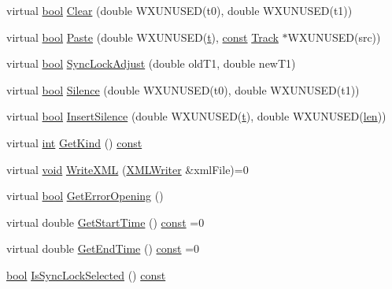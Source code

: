 \begin{DoxyCompactItemize}
virtual \hyperlink{mac_2config_2i386_2lib-src_2libsoxr_2soxr-config_8h_abb452686968e48b67397da5f97445f5b}{bool} \hyperlink{class_track_a725fa0a27976e10fd01859baa2f29ff7}{Clear} (double W\+X\+U\+N\+U\+S\+ED(t0), double W\+X\+U\+N\+U\+S\+ED(t1))
\item 
virtual \hyperlink{mac_2config_2i386_2lib-src_2libsoxr_2soxr-config_8h_abb452686968e48b67397da5f97445f5b}{bool} \hyperlink{class_track_abea1b02917a4dc8ad75331e14f7ea651}{Paste} (double W\+X\+U\+N\+U\+S\+ED(\hyperlink{octave__test_8m_aaccc9105df5383111407fd5b41255e23}{t}), \hyperlink{getopt1_8c_a2c212835823e3c54a8ab6d95c652660e}{const} \hyperlink{class_track}{Track} $\ast$W\+X\+U\+N\+U\+S\+ED(src))
\item 
virtual \hyperlink{mac_2config_2i386_2lib-src_2libsoxr_2soxr-config_8h_abb452686968e48b67397da5f97445f5b}{bool} \hyperlink{class_track_a8d065b881a5fe83b2d938b62f9eba89e}{Sync\+Lock\+Adjust} (double old\+T1, double new\+T1)
\item 
virtual \hyperlink{mac_2config_2i386_2lib-src_2libsoxr_2soxr-config_8h_abb452686968e48b67397da5f97445f5b}{bool} \hyperlink{class_track_aecfb56d63d2cb24884a7a562678d31bd}{Silence} (double W\+X\+U\+N\+U\+S\+ED(t0), double W\+X\+U\+N\+U\+S\+ED(t1))
\item 
virtual \hyperlink{mac_2config_2i386_2lib-src_2libsoxr_2soxr-config_8h_abb452686968e48b67397da5f97445f5b}{bool} \hyperlink{class_track_a60a17fff33826814476f69f93b702235}{Insert\+Silence} (double W\+X\+U\+N\+U\+S\+ED(\hyperlink{octave__test_8m_aaccc9105df5383111407fd5b41255e23}{t}), double W\+X\+U\+N\+U\+S\+ED(\hyperlink{lib_2expat_8h_af86d325fecfc8f47b61fbf5a5146f582}{len}))
\item 
virtual \hyperlink{xmltok_8h_a5a0d4a5641ce434f1d23533f2b2e6653}{int} \hyperlink{class_track_ad71d0460cf42bcde59dcf600af7ef6b7}{Get\+Kind} () \hyperlink{getopt1_8c_a2c212835823e3c54a8ab6d95c652660e}{const} 
\item 
virtual \hyperlink{sound_8c_ae35f5844602719cf66324f4de2a658b3}{void} \hyperlink{class_track_a1352ca92740f520fc35ad17c79072110}{Write\+X\+ML} (\hyperlink{class_x_m_l_writer}{X\+M\+L\+Writer} \&xml\+File)=0
\item 
virtual \hyperlink{mac_2config_2i386_2lib-src_2libsoxr_2soxr-config_8h_abb452686968e48b67397da5f97445f5b}{bool} \hyperlink{class_track_ad4f4b2a5e9fb7ea7cf337010424775f2}{Get\+Error\+Opening} ()
\item 
virtual double \hyperlink{class_track_a764ce3c8ef7dd892b8cf64022a946cd5}{Get\+Start\+Time} () \hyperlink{getopt1_8c_a2c212835823e3c54a8ab6d95c652660e}{const}  =0
\item 
virtual double \hyperlink{class_track_a94b9fd13ee5b04493ed1024715e9c62b}{Get\+End\+Time} () \hyperlink{getopt1_8c_a2c212835823e3c54a8ab6d95c652660e}{const}  =0
\item 
\hyperlink{mac_2config_2i386_2lib-src_2libsoxr_2soxr-config_8h_abb452686968e48b67397da5f97445f5b}{bool} \hyperlink{class_track_a4b9d8ec8baa8ce94f9b9b999e324a59f}{Is\+Sync\+Lock\+Selected} () \hyperlink{getopt1_8c_a2c212835823e3c54a8ab6d95c652660e}{const} 
\end{DoxyCompactItemize}
